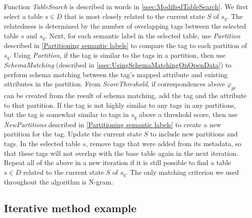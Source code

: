 Function \textit{TableSearch} is described in words in \autoref{ssec:ModifiedTableSearch}. We first select a table $s\in D$ that is most closely related to the current state $S$ of $s_q$. The relatedness is determined by the number of overlapping tags between the selected table $s$ and $s_q$. Next, for each semantic label in the selected table, use \textit{Partition} described in \autoref{Partitioning semantic labels} to compare the tag to each partition of $s_q$. Using \textit{Partition}, if the tag is similar to the tags in a partition, then use \textit{SchemaMatching} (described in \autoref{ssec:UsingSchemaMatchingOnOpenData}) to perform schema matching between the tag's mapped attribute and existing attributes in the partition. From \textit{ScoreThreshold}, if correspondences above $\ensuremath{\varphi}_{pt}$ can be created from the result of schema matching, add the tag and the attribute to that partition. If the tag is not highly similar to any tags in any partitions, but the tag is somewhat similar to tags in $s_q$ above a threshold score, then use \textit{NewPartitions} described in \autoref{Partitioning semantic labels} to create a new partition for the tag. Update the current state $S$ to include new partitions and tags. In the selected table $s$, remove tags that were added from its metadata, so that these tags will not overlap with the base table again in the next iteration. Repeat all of the above in a new iteration if it is still possible to find a table $s\in D$ related to the current state $S$ of $s_q$. The only matching criterion we used throughout the algorithm is N-gram.

\subsection{Iterative method example}
\label{ssec:IterativeMethodExample}

